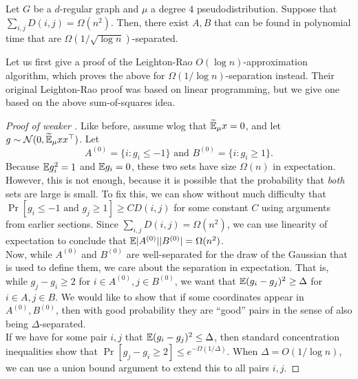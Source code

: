 	\begin{ftheo}
		\label{arv-glob-struct}
		Let $G$ be a $d$-regular graph and $\mu$ a degree $4$ pseudodistribution. Suppose that $\sum_{i,j} D(i,j) = \Omega(n^2)$.
		Then, there exist $A,B$ that can be found in polynomial time that are $\Omega(1/\sqrt{\log n})$-separated.
	\end{ftheo}
	Let us first give a proof of the Leighton-Rao $O(\log n)$-approximation algorithm, which proves the above for $\Omega(1/\log n)$-separation instead. Their original Leighton-Rao proof was based on linear programming, but we give one based on the above sum-of-squares idea.
	\begin{proof}[Proof of weaker ]
		Like before, assume wlog that $\widetilde{\mathbb{E}}_\mu x = 0$, and let $g \sim \mathcal{N}(0,\widetilde{\mathbb{E}}_\mu xx^\top)$. Let
		\[ A^{(0)} = \{i : g_i \le -1\} \text{ and } B^{(0)} = \{i : g_i \ge 1\}. \]
		Because $\mathbb{E} g_i^2 = 1$ and $\mathbb{E} g_i = 0$, these two sets have size $\Omega(n)$ in expectation.\\
		However, this is not enough, because it is possible that the probability that \emph{both} sets are large is small. To fix this, we can show without much difficulty that $\Pr[g_i \le -1 \text{ and } g_j \ge 1] \ge C D(i,j)$ for some constant $C$ using arguments from earlier sections. Since $\sum_{i,j} D(i,j) = \Omega(n^2)$, we can use linearity of expectation to conclude that $\mathbb{E} |A^{(0)}||B^{(0)}| = \Omega(n^2)$.\\
		Now, while $A^{(0)}$ and $B^{(0)}$ are well-separated for the draw of the Gaussian that is used to define them, we care about the separation in expectation. That is, while $g_j - g_i \ge 2$ for $i \in A^{(0)}, j \in B^{(0)}$, we want that $\mathbb{E} (g_i - g_j)^2 \ge \Delta$ for $i \in A, j \in B$. We would like to show that if some coordinates appear in $A^{(0)},B^{(0)}$, then with good probability they are ``good'' pairs in the sense of also being $\Delta$-separated. \\
		If we have for some pair $i,j$ that $\mathbb{E} (g_i - g_j)^2 \le \Delta$, then standard concentration inequalities show that $\Pr[g_j - g_i \ge 2] \le e^{-\Omega(1/\Delta)}$. When $\Delta = O(1/\log n)$, we can use a union bound argument to extend this to all pairs $i,j$.
	\end{proof}

